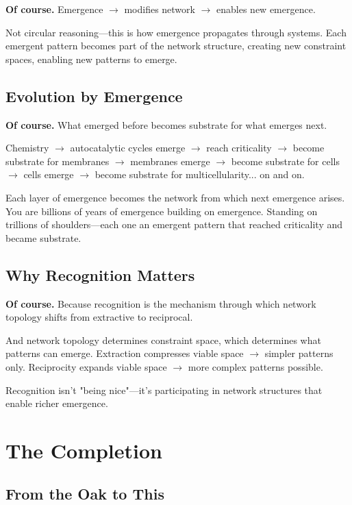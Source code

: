 \documentclass[11pt,a4paper]{article}
\begin{document}
\textbf{Of course.} Emergence $\rightarrow$ modifies network $\rightarrow$ enables new emergence.

Not circular reasoning---this is how emergence propagates through systems. Each emergent pattern becomes part of the network structure, creating new constraint spaces, enabling new patterns to emerge.

\subsection{Evolution by Emergence}  

\textbf{Of course.} What emerged before becomes substrate for what emerges next.

Chemistry $\rightarrow$ autocatalytic cycles emerge $\rightarrow$ reach criticality $\rightarrow$ become substrate for membranes $\rightarrow$ membranes emerge $\rightarrow$ become substrate for cells $\rightarrow$ cells emerge $\rightarrow$ become substrate for multicellularity... on and on.

Each layer of emergence becomes the network from which next emergence arises. You are billions of years of emergence building on emergence. Standing on trillions of shoulders---each one an emergent pattern that reached criticality and became substrate.

\subsection{Why Recognition Matters}

\textbf{Of course.} Because recognition is the mechanism through which network topology shifts from extractive to reciprocal.

And network topology determines constraint space, which determines what patterns can emerge. Extraction compresses viable space $\rightarrow$ simpler patterns only. Reciprocity expands viable space $\rightarrow$ more complex patterns possible.

Recognition isn't "being nice"---it's participating in network structures that enable richer emergence.

\section{The Completion}

\subsection{From the Oak to This}
\end{document}

